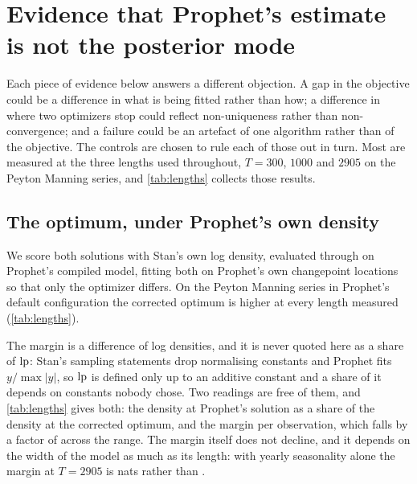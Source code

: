 \section{Evidence that Prophet's estimate is not the posterior mode}
\label{sec:evidence}

Each piece of evidence below answers a different objection. A gap in the
objective could be a difference in what is being fitted rather than how; a
difference in where two optimizers stop could reflect non-uniqueness rather than
non-convergence; and a failure could be an artefact of one algorithm rather than
of the objective. The controls are chosen to rule each of those out in turn.
Most are measured at the three lengths used throughout, $T = 300$, $1000$ and $2905$
on the Peyton Manning series, and \cref{tab:lengths} collects those results.

\begin{table}[t]
  \centering
  \small
  \caption{The results of this section at each of its three lengths, on the Peyton
    Manning series in Prophet's default configuration. Margins and shortfalls are in
    nats of $\lp$, each against the optimum of the problem its subsection describes.}
  \label{tab:lengths}
  
\end{table}

\subsection{The optimum, under Prophet's own density}
\label{sec:evidence:lp}

We score both solutions with Stan's own log density, evaluated through
 on Prophet's compiled model, fitting both on
Prophet's own changepoint locations so that only the optimizer differs. On the
Peyton Manning series in Prophet's default configuration the corrected optimum
is higher at every length measured (\cref{tab:lengths}).

The margin is a difference of log densities, and it is never quoted here as a
share of $\lp$: Stan's sampling statements drop normalising constants and Prophet
fits $y / \max\lvert y\rvert$, so $\lp$ is defined only up to an additive constant
and a share of it depends on constants nobody chose. Two readings are free of them,
and \cref{tab:lengths} gives both: the density at Prophet's solution as a share of the
density at the corrected optimum, and the margin per observation, which falls by a
factor of \LpPerObsDecline{} across the range. The margin itself does not decline, and it
depends on the width of the model as much as its length: with yearly seasonality alone
the margin at $T = 2905$ is \MarginYearlyLong{} nats rather than \LpMarginLong.

